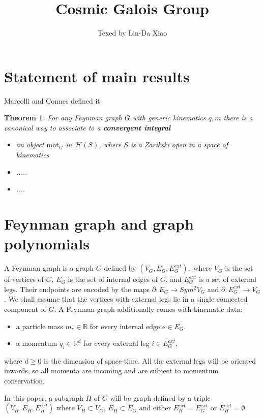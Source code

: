 \documentclass[11pt]{article}
\title{\bf Cosmic Galois Group}
\author{Texed by Lin-Da Xiao} %
\newtheorem{thm}{Theorem}[section]
\newcommand{\pd}{\partial}
\newcommand{\reals}{\mathbb R}
\newcommand{\lrta}{\longrightarrow}
\begin{document}
\maketitle
\tableofcontents
\newpage
\section{Statement of main results}
Marcolli and Connes defined it
\begin{thm}
For any Feynman graph $G$ with generic kinematics $q,m$ there is a canonical way to associate to a \textbf{convergent integral}
\begin{itemize}
\item an object $\text{mot}_G$ in $\mathcal{H}(S)$, where $S$ is a Zarikski open in a space of kinematics
\item .....
\item ....
\end{itemize}
\end{thm}
\section{Feynman graph and graph polynomials}
A Feynman graph is a graph $G$ defined by
$(V_G,E_G,E_G^{ext}),$ where $V_G$ is the set of vertices of $G$, $E_G$ is the set of internal edges of $G$, and $E^{ext}_G$ is a set of external legs. Their endpoints are encoded by the maps $\pd:E_G\lrta Sym^{2}V_G$ and $\pd:E_G^{ext}\lrta V_G$. We shall assume that the vertices with external legs lie in a single connected  component of $G$. A Feynman graph additionally comes with kinematic data:
\begin{itemize}
\item a particle mass $m_e\in \reals$ for every internal edge $e\in E_G$.
\item a momentum $q_i\in \reals^d$ for every external leg $i\in E^{ext}_G$,
\end{itemize}
where $d\geq 0$ is the dimension of space-time. All the external legs will be oriented inwards, so all momenta are incoming and are subject to momentum conservation.

In this paper, a subgraph $H$ of $G$ will be graph defined by a triple $(V_H,E_H,E^{ext}_H)$ where $V_H\subset V_G$, $E_H\subset E_G$ and either $E^{ext}_H=E^{ext}_G$ or $E^{ext}_H=\emptyset$.
\end{document}
